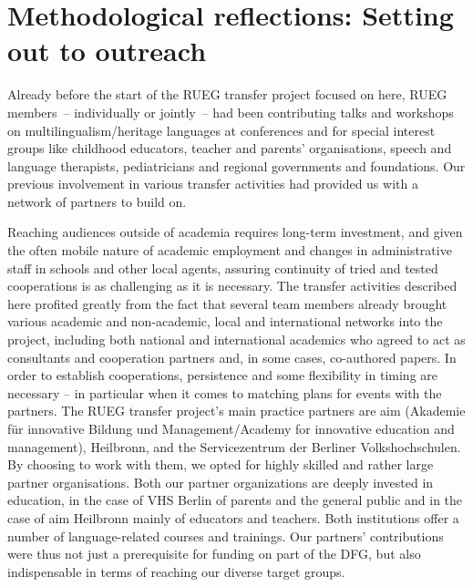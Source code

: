 \documentclass[output=paper,colorlinks,citecolor=brown]{langscibook}
\begin{document}
\section{Methodological reflections: Setting out to outreach} \label{sec:purkathoferetal:3}
\largerpage

Already before the start of the RUEG transfer project focused on here, RUEG members~– individually or jointly~– had been contributing talks and workshops on multilingualism\slash heritage languages at conferences and for special interest groups like childhood educators, teacher and parents’ organisations, speech and language therapists, pediatricians and regional governments and foundations. Our previous involvement in various transfer activities had provided us with a network of partners to build on.

Reaching audiences outside of academia requires long-term investment, and given the often mobile nature of academic employment and changes in administrative staff in schools and other local agents, assuring continuity of tried and tested cooperations is as challenging as it is necessary. The transfer activities described here profited greatly from the fact that several team members already brought various academic and non-academic, local and international networks into the project, including both national and international academics who agreed to act as consultants and cooperation partners and, in some cases, co-authored papers. In order to establish cooperations, persistence and some flexibility in timing are necessary – in particular when it comes to matching plans for events with the partners. The RUEG transfer project’s main practice partners are aim (Akademie für innovative Bildung und Management\slash Academy for innovative education and management), Heilbronn, and the Servicezentrum der Berliner Volkshochschulen. By choosing to work with them, we opted for highly skilled and rather large partner organisations. Both our partner organizations are deeply invested in education, in the case of VHS Berlin of parents and the general public and in the case of aim Heilbronn mainly of educators and teachers. Both institutions offer a number of language-related courses and trainings. Our partners’ contributions were thus not just a prerequisite for funding on part of the DFG, but also indispensable in terms of reaching our diverse target groups.
\end{document}
